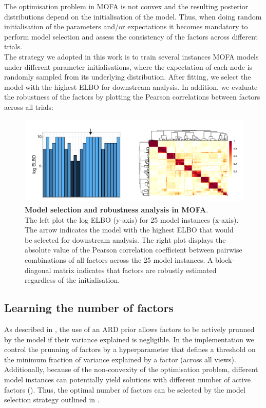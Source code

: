 The optimisation problem in MOFA is not convex and the resulting posterior distributions depend on the initialisation of the model. Thus, when doing random initialisation of the parameters and/or expectations it becomes mandatory to perform model selection and assess the consistency of the factors across different trials.\\
The strategy we adopted in this work is to train several instances MOFA models under different parameter initialisations, where the expectation of each node is randomly sampled from its underlying distribution. After fitting, we select the model with the highest ELBO for downstream analysis. In addition, we evaluate the robustness of the factors by plotting the Pearson correlations between factors across all trials:

\begin{figure}[H]
	\centering 	
	\includegraphics[width=1.0\textwidth]{MOFA_robustness}
	\caption{ \textbf{Model selection and robustness analysis in MOFA}.\\
	The left plot the log ELBO (y-axis) for 25 model instances (x-axis). The arrow indicates the model with the highest ELBO that would be selected for downstream analysis. The right plot displays the absolute value of the Pearson correlation coefficient between pairwise combinations of all factors across the 25 model instances. A block-diagonal matrix indicates that factors are robustly estimated regardless of the initialisation.}
	\label{fig:MOFA_robustness}
\end{figure}


\subsection{Learning the number of factors} \label{section:mofa_nfactors}

As described in , the use of an ARD prior allows factors to be actively prunned by the model if their variance explained is negligible. In the implementation we control the prunning of factors by a hyperparameter that defines a threshold on the minimum fraction of variance explained by a factor (across all views).\\
Additionally, because of the non-convexity of the optimisation problem, different model instances can potentially yield solutions with different number of active factors (). Thus, the optimal number of factors can be selected by the model selection strategy outlined in .

